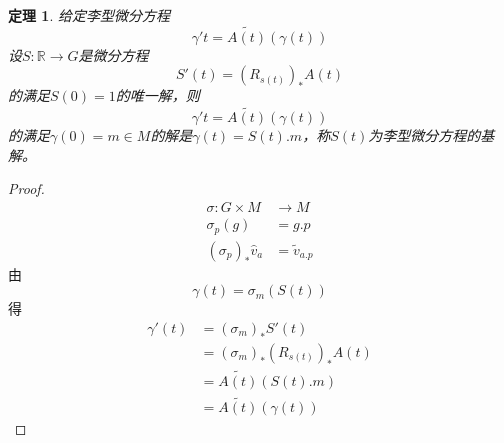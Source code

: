 \documentclass[winfonts,UTF8,c5size,a4paper,fancyhdr,hyperref,titlepage,nocap]{ctexart}
\newtheorem{thm}{定理}
\theoremstyle{definition}
\theoremstyle{remark}
\numberwithin{equation}{subsection}
\newcommand{\Real}{\mathbb{R}}
\newcommand{\red}{\color{red}}
\begin{document}
\begin{thm}
  给定李型微分方程
\begin{equation*}
\gamma'{t}=\widetilde{A(t)}(\gamma(t))
\end{equation*}
设$S\colon\Real\to G$是微分方程
\begin{equation*}
S'(t)=(R_{s(t)})_{\ast}A(t)
\end{equation*}
的满足$S(0)=1$的唯一解，则
\begin{equation*}
\gamma'{t}=\widetilde{A(t)}(\gamma(t))
\end{equation*}
的满足$\gamma(0)=m\in M$的解是$\gamma(t)=S(t).m$，称$S(t)$为李型微分方程的{\red 基解}。
\end{thm}
\begin{proof}
\begin{align*}
\sigma\colon G\times M&\to M\\
\sigma_p(g)&=g.p\\
(\sigma_p)_{\ast}\widehat{v}_a&=\widetilde{v}_{a.p}
\end{align*}
由
\begin{equation*}
\gamma(t)=\sigma_m(S(t))
\end{equation*}
得
\begin{align*}
\gamma'(t)&=(\sigma_m)_{\ast}S'(t)\\
          &=(\sigma_m)_{\ast}(R_{s(t)})_{\ast}A(t)\\
          &=\widetilde{A(t)}(S(t).m)\\
          &=\widetilde{A(t)}(\gamma(t))
\end{align*}
\end{proof}
\end{document}

